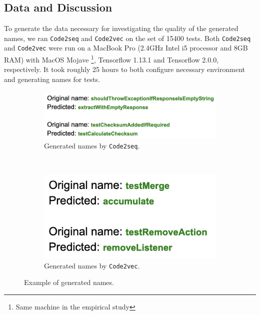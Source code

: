 \begin{appendices}
\subsection{Data and Discussion}

To generate the data necessary for investigating the quality of the generated names, we ran \texttt{Code2seq} and \texttt{Code2vec} on the set of \num{15400} tests.
%
Both \texttt{Code2seq} and \texttt{Code2vec} were run on a MacBook Pro (2.4GHz Intel i5 processor and 8GB RAM) with MacOS Mojave \footnote{Same machine in the empirical study}, Tensorflow 1.13.1 and Tensorflow 2.0.0, respectively.
It took roughly \num{25} hours to both configure necessary environment and generating names for tests.

\begin{figure}[t]
\centering
\begin{subfigure}[b]{1.0\textwidth}
\centering
\includegraphics[scale=0.5]{figures/dup1.png}
\caption{Generated names by \texttt{Code2seq}.}
\label{fig:generated1}
\end{subfigure}\\
\vspace{0.2cm}
\begin{subfigure}[b]{0.5\textwidth}
\centering
\includegraphics[scale=0.5]{figures/dup2.png}
\caption{Generated names by \texttt{Code2vec}.}
\label{fig:generated2}
\end{subfigure}
\caption{Example of generated names.}
\label{fig:duplicate-names}
\end{figure}



\end{appendices}
